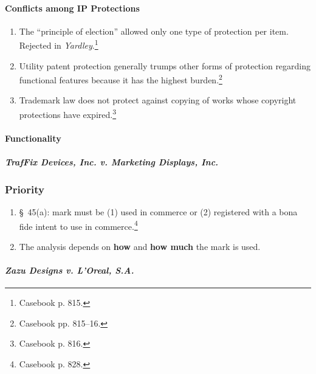\paragraph{Conflicts among IP Protections}

\begin{enumerate}
    \item The ``principle of election'' allowed only one type of protection 
    per item. Rejected in \emph{Yardley}.\footnote{Casebook p. 815.}
    \item Utility patent protection generally trumps other forms of protection 
    regarding functional features because it has the highest 
    burden.\footnote{Casebook pp. 815--16.}
    \item Trademark law does not protect against copying of works whose 
    copyright protections have expired.\footnote{Casebook p. 816.}
\end{enumerate}

\paragraph{Functionality}


\paragraph{\emph{TrafFix Devices, Inc. v. Marketing Displays, Inc.}}


\subsubsection{Priority}

\begin{enumerate}
    \item \S\ 45(a): mark must be (1) used in commerce or (2) registered with 
    a bona fide intent to use in commerce.\footnote{Casebook p. 828.}
    \item The analysis depends on \textbf{how} and \textbf{how much} the mark 
    is used.
\end{enumerate}

\paragraph{\emph{Zazu Designs v. L'Oreal, S.A.}}


